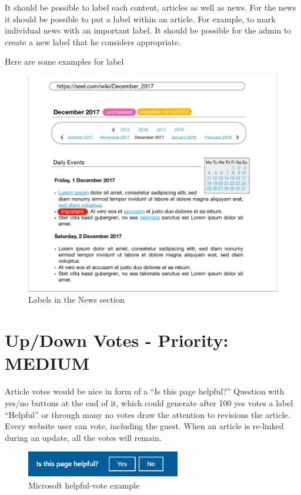 It should be possible to label each content, articles as well as news. For the news it should be possible to put a label within an article. For example, to mark individual news with an important label. It should be possible for the admin to create a new label that he considers appropriate.



Here are some examples for label
\begin{figure}[h] 
    \centering
    \includegraphics[scale=0.25]{Pictures/labels}
    \caption{Labels in the News section}
\end{figure} 


\section{Up/Down Votes - Priority: MEDIUM}
Article votes would be nice in form of a “Is this page helpful?” Question with yes/no buttons at the end of it, which could generate after 100 yes votes a label “Helpful” or through many no votes draw the attention to revisions the article.
Every website user can vote, including the guest. When an article is re-linked during an update, all the votes will remain.

\begin{figure}[h] 
    \centering
    \includegraphics[width=0.6\textwidth]{Pictures/helpful_vote}
    \caption{Microsoft helpful-vote example}
\end{figure} 

